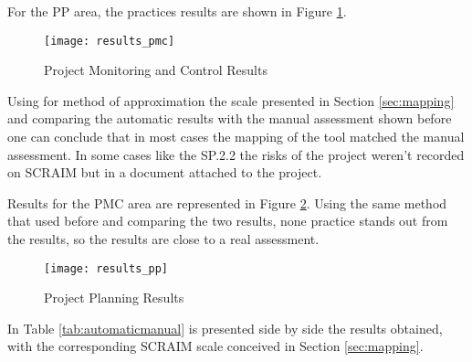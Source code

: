 For the PP area, the practices results are shown in Figure \ref{fig:results_pp}.

\begin{figure}[H]
	\begin{center}
		\leavevmode
		\texttt{[image: results\_pmc]}
		\caption{Project Monitoring and Control Results}
		\label{fig:results_pp}
	\end{center}
\end{figure}

Using for method of approximation the scale presented in Section \ref{sec:mapping} and comparing the automatic results with the manual assessment shown before one can conclude that in most cases the mapping of the tool matched the manual assessment. In some cases like  the SP.2.2 the risks of the project weren't recorded on SCRAIM but in a document attached to the project.


Results for the PMC area are represented in Figure \ref{fig:results_pmc}. Using the same method that used before and comparing the two results, none practice stands out from the results, so the results are close to a real assessment.

\begin{figure}[H]
	\begin{center}
		\leavevmode
		\texttt{[image: results\_pp]}
		\caption{Project Planning Results}
		\label{fig:results_pmc}
	\end{center}
\end{figure}


In Table \ref{tab:automaticmanual} is presented side by side the results obtained, with the corresponding SCRAIM scale conceived in  Section \ref{sec:mapping}.

